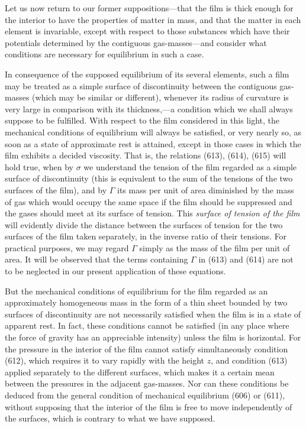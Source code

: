 \documentclass[12pt]{article}
\begin{document}
Let us now return to our former suppositions---that the film is thick enough for the interior to have the properties of matter in mass, and that the matter in each element is invariable, except with respect to those substances which have their potentials determined by the contiguous gas-masses---and consider what conditions are necessary for equilibrium in such a case.

In consequence of the supposed equilibrium of its several elements, such a film may be treated as a simple surface of discontinuity between the contiguous gas-masses (which may be similar or different), whenever its radius of curvature is very large in comparison with its thickness,---a condition which we shall always suppose to be fulfilled. With respect to the film considered in this light, the mechanical conditions of equilibrium will always be satisfied, or very nearly so, as soon as a state of approximate rest is attained, except in those cases in which the film exhibits a decided viscosity. That is, the relations (613), (614), (615) will hold true, when by $\sigma$ we understand the tension of the film regarded as a simple surface of discontinuity (this is equivalent to the sum of the tensions of the two surfaces of the film), and by $\Gamma$ its mass per unit of area diminished by the mass of gas which would occupy the same space if the film should be suppressed and the gases should meet at its surface of tension. This \textit{surface of tension of the film} will evidently divide the distance between the surfaces of tension for the two surfaces of the film taken separately, in the inverse ratio of their tensions. For practical purposes, we may regard $\Gamma$ simply as the mass of the film per unit of area. It will be observed that the terms containing $\Gamma$ in (613) and (614) are not to be neglected in our present application of these equations.

But the mechanical conditions of equilibrium for the film regarded as an approximately homogeneous mass in the form of a thin sheet bounded by two surfaces of discontinuity are not necessarily satisfied when the film is in a state of apparent rest. In fact, these conditions cannot be satisfied (in any place where the force of gravity has an appreciable intensity) unless the film is horizontal. For the pressure in the interior of the film cannot satisfy simultaneously condition (612), which requires it to vary rapidly with the height $z$, and condition (613) applied separately to the different surfaces, which makes it a certain mean between the pressures in the adjacent gas-masses. Nor can these conditions be deduced from the general condition of mechanical equilibrium (606) or (611), without supposing that the interior of the film is free to move independently of the surfaces, which is contrary to what we have supposed.
\end{document}
